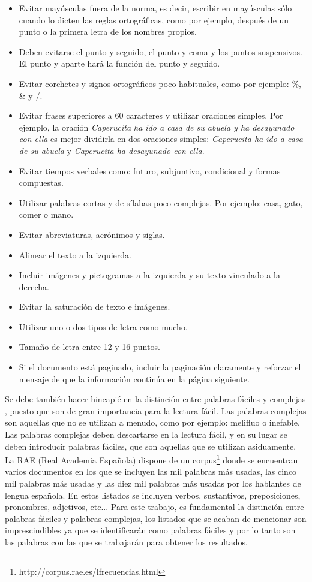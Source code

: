 \begin{itemize}
	\item Evitar mayúsculas fuera de la norma, es decir, escribir en mayúsculas sólo cuando lo dicten las reglas ortográficas, como por ejemplo, después de un punto o la primera letra de los nombres propios.
	\item Deben evitarse el punto y seguido, el punto y coma y los puntos suspensivos. El punto y aparte hará la función del punto y seguido.
	\item Evitar corchetes y signos ortográficos poco habituales, como por ejemplo: \%, \& y /.
	\item Evitar frases superiores a 60 caracteres y utilizar oraciones simples. Por ejemplo, la oración \textit{Caperucita ha ido a casa de su abuela y ha desayunado con ella} es mejor dividirla en dos oraciones simples:\textit{ Caperucita ha ido a casa de su abuela} y  \textit{Caperucita ha desayunado con ella}.
	\item Evitar tiempos verbales como: futuro, subjuntivo, condicional y formas compuestas.
	\item Utilizar palabras cortas y de sílabas poco complejas. 
	Por ejemplo: casa, gato, comer o mano.
	\item Evitar abreviaturas, acrónimos y siglas.
	\item Alinear el texto a la izquierda.
	\item Incluir imágenes y pictogramas a la izquierda y su texto vinculado a la derecha.
	\item Evitar la saturación de texto e imágenes.
	\item Utilizar uno o dos tipos de letra como mucho.
	\item Tamaño de letra entre 12 y 16 puntos.
	\item Si el documento está paginado, incluir la paginación claramente y reforzar el mensaje de que la información continúa en la página siguiente.
\end{itemize}

Se debe también hacer hincapié en la distinción entre palabras fáciles y complejas \citep{GarciaMunoz2012LecturaFacil}, puesto que son de gran importancia para la lectura fácil. 
Las palabras complejas son aquellas que no se utilizan a menudo, como por ejemplo: melifluo o inefable. Las palabras complejas deben descartarse en la lectura fácil, y en su lugar se deben introducir palabras fáciles, que son aquellas que se utilizan asiduamente. La RAE (Real Academia Española) dispone de un corpus\footnote{http://corpus.rae.es/lfrecuencias.html} donde se encuentran varios documentos en los que se incluyen las mil palabras más usadas, las cinco mil palabras más usadas y las diez mil palabras más usadas por los hablantes de lengua española. En estos listados se incluyen verbos, sustantivos, preposiciones, pronombres, adjetivos, etc...
Para este trabajo, es fundamental la distinción entre palabras fáciles y palabras complejas, los listados que se acaban de mencionar son imprescindibles ya que se identificarán como palabras fáciles y por lo tanto son las palabras con las que se trabajarán para obtener los resultados.

